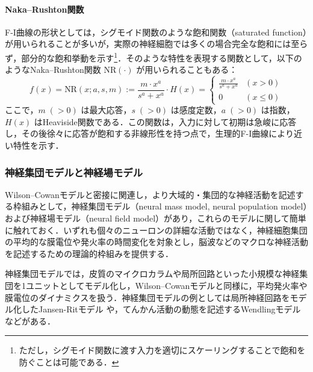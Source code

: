 \documentclass[titlepage]{ltjsbook}
\begin{document}
\paragraph{Naka–Rushton関数}
F-I曲線の形状としては，シグモイド関数のような飽和関数（saturated function）が用いられることが多いが，実際の神経細胞では多くの場合完全な飽和には至らず，部分的な飽和挙動を示す\footnote{ただし，シグモイド関数に渡す入力を適切にスケーリングすることで飽和を防ぐことは可能である．}．そのような特性を表現する関数として，以下のようなNaka–Rushton関数 $\textrm{NR}(\cdot)$ が用いられることもある\citep{naka1966s,sclar1990coding,wilson1999spikes}：
\begin{equation}
f(x) = \textrm{NR}(x; a, s, m):=\frac{m\cdot x^a}{s^a + x^a} \cdot H(x)
=\begin{cases}
\frac{m\cdot x^a}{s^a + x^a} & (x > 0) \\
0 & (x \leq 0)
\end{cases}
\end{equation}
ここで，$m\;(>0)$ は最大応答，$s\;(>0)$ は感度定数，$a\;(>0)$ は指数，$H(x)$ はHeaviside関数である．この関数は，入力に対して初期は急峻に応答し，その後徐々に応答が飽和する非線形性を持つ点で，生理的F-I曲線により近い特性を示す．

\subsubsection{神経集団モデルと神経場モデル}
Wilson–Cowanモデルと密接に関連し，より大域的・集団的な神経活動を記述する枠組みとして，神経集団モデル（neural mass model, neural population model）および神経場モデル（neural field model）があり，これらのモデルに関して簡単に触れておく．いずれも個々のニューロンの詳細な活動ではなく，神経細胞集団の平均的な膜電位や発火率の時間変化を対象とし，脳波などのマクロな神経活動を記述するための理論的枠組みを提供する．

神経集団モデルでは，皮質のマイクロカラムや局所回路といった小規模な神経集団を1ユニットとしてモデル化し，Wilson–Cowanモデルと同様に，平均発火率や膜電位のダイナミクスを扱う．神経集団モデルの例としては局所神経回路をモデル化したJansen-Ritモデル \citep{jansen1995electroencephalogram, david2003neural} や，てんかん活動の動態を記述するWendlingモデル \citep{wendling2002epileptic} などがある．
\end{document}

